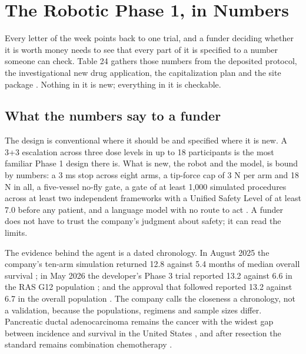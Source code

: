\section{The Robotic Phase 1, in Numbers}

Every letter of the week points back to one trial, and a funder deciding whether
it is worth money needs to see that every part of it is specified to a number
someone can check. Table 24 gathers those numbers from the deposited protocol,
the investigational new drug application, the capitalization plan and the site
package \cite{onpremwhippl,phase1ind,capitalplan2026,movein2026}. Nothing in it
is new; everything in it is checkable.

\subsection{What the numbers say to a funder}

The design is conventional where it should be and specified where it is new. A
3+3 escalation across three dose levels in up to 18 participants is the most
familiar Phase 1 design there is. What is new, the robot and the model, is bound
by numbers: a 3 ms stop across eight arms, a tip-force cap of 3 N per arm and
18 N in all, a five-vessel no-fly gate, a gate of at least 1,000 simulated
procedures across at least two independent frameworks with a Unified Safety
Level of at least 7.0 before any patient, and a language model with no route to
act \cite{onpremwhippl,phase1ind}. A funder does not have to trust the
company's judgment about safety; it can read the limits.

The evidence behind the agent is a dated chronology. In August 2025 the
company's ten-arm simulation returned 12.8 against 5.4 months of median overall
survival \cite{qspmetpancre}; in May 2026 the developer's Phase 3 trial reported
13.2 against 6.6 in the RAS G12 population \cite{rasolute302}; and the approval
that followed reported 13.2 against 6.7 in the overall population
\cite{fdarasonque2026}. The company calls the closeness a chronology, not a
validation, because the populations, regimens and sample sizes differ.
Pancreatic ductal adenocarcinoma remains the cancer with the widest gap between
incidence and survival in the United States \cite{siegel2025statistics}, and
after resection the standard remains combination chemotherapy
\cite{conroy2018folfirinox}.


